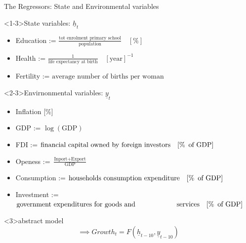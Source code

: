 \documentclass[9pt]{beamer}
\begin{document}
\begin{frame}{The Regressors: State and Environmental variables}
	\begin{block}<1-3>{State variables: $ \underline{h}_t$}
		\begin{itemize}
			\item  Education := $\frac{\text{tot enrolment primary school}}{\text{population}} \quad [\%]$
			\item Health := $\frac{1}{\text{life expectancy at birth}} \quad [\text{year}]^{-1}$
			\item Fertility := $\text{average number of births per woman}$
		\end{itemize}
		
	\end{block}
	\begin{block}<2-3>{Envirnonmental variables: $\underline{y}_t$}
		\begin{itemize}
			\item Inflation [\%]
			\item GDP := $ \log(\text{GDP}) $
			\item FDI := $\text{financial capital owned by foreign investors} \quad [\% \enskip   \text{of GDP}]$
			\item Openess := $\frac{\text{Inport} + \text{Export}}{\text{GDP}}$
			\item Consumption := $\text{households consumption expenditure} \quad [\% \enskip   \text{of GDP}] $

			\item Investment := $\text{government expenditures for goods and} \newline \hspace*{2cm}\text{ services} \quad [\% \enskip   \text{of GDP}]$
		\end{itemize}
	\end{block}
	\begin{block}{abstract model}
		\[
	\implies	Growth_t = F(\underline{h}_{t-10},\underline{y}_{t-10})
		\]
	\end{block}

\end{frame}
\end{document}
